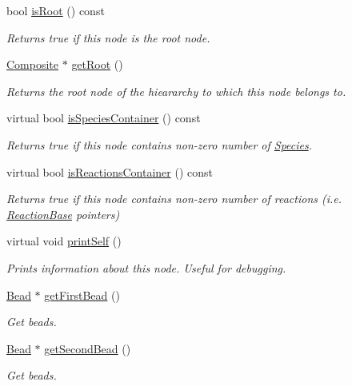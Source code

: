 \begin{DoxyCompactItemize}
bool \hyperlink{classComponent_a4f0bed8144509d6565a30b548fac0fe7}{is\+Root} () const 
\begin{DoxyCompactList}\small\item\em Returns true if this node is the root node. \end{DoxyCompactList}\item 
\hyperlink{classComposite}{Composite} $\ast$ \hyperlink{classComponent_abcb3746cb8b4afcecf437dce40c0c772}{get\+Root} ()
\begin{DoxyCompactList}\small\item\em Returns the root node of the hieararchy to which this node belongs to. \end{DoxyCompactList}\item 
virtual bool \hyperlink{classComponent_a0daf865ff32aff9e68316c65b681cbf9}{is\+Species\+Container} () const 
\begin{DoxyCompactList}\small\item\em Returns true if this node contains non-\/zero number of \hyperlink{classSpecies}{Species}. \end{DoxyCompactList}\item 
virtual bool \hyperlink{classComponent_a506e080028078ef9a753d854c60904a3}{is\+Reactions\+Container} () const 
\begin{DoxyCompactList}\small\item\em Returns true if this node contains non-\/zero number of reactions (i.\+e. \hyperlink{classReactionBase}{Reaction\+Base} pointers) \end{DoxyCompactList}\item 
virtual void \hyperlink{classComponent_a871fbdc783ea600ed667dd37eb8adf1e}{print\+Self} ()
\begin{DoxyCompactList}\small\item\em Prints information about this node. Useful for debugging. \end{DoxyCompactList}\end{DoxyCompactItemize}
{\bf }\par
\begin{DoxyCompactItemize}
\item 
\hyperlink{classBead}{Bead} $\ast$ \hyperlink{classCylinder_a07c1366559d10681ebc873f305c28f3f}{get\+First\+Bead} ()
\begin{DoxyCompactList}\small\item\em Get beads. \end{DoxyCompactList}\item 
\hyperlink{classBead}{Bead} $\ast$ \hyperlink{classCylinder_a954ee598c495e6b86c33b684d2c16435}{get\+Second\+Bead} ()
\begin{DoxyCompactList}\small\item\em Get beads. \end{DoxyCompactList}\end{DoxyCompactItemize}

